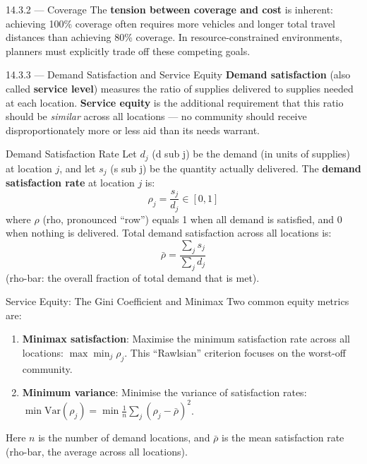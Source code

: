 \documentclass[aspectratio=169,10pt]{beamer}
\begin{document}
\begin{frame}[allowframebreaks]{14.3.2 --- Coverage}
  \medskip
  The \textbf{tension between coverage and cost} is inherent:
  achieving 100\% coverage often requires more vehicles and longer
  total travel distances than achieving 80\% coverage.
  In resource-constrained environments, planners must explicitly trade
  off these competing goals.
\end{frame}

\begin{frame}[allowframebreaks]{14.3.3 --- Demand Satisfaction and Service Equity}
  \textbf{Demand satisfaction} (also called \textbf{service level})
  measures the ratio of supplies delivered to supplies needed at each
  location.
  \textbf{Service equity} is the additional requirement that this ratio
  should be \emph{similar} across all locations --- no community should
  receive disproportionately more or less aid than its needs warrant.

  \medskip
  \begin{block}{Demand Satisfaction Rate}
    Let $d_j$ (d sub j) be the demand (in units of supplies) at
    location $j$, and let $s_j$ (s sub j) be the quantity actually
    delivered.
    The \textbf{demand satisfaction rate} at location $j$ is:
    \[
      \rho_j = \frac{s_j}{d_j} \in [0, 1]
    \]
    where $\rho$ (rho, pronounced ``row'') equals 1 when all demand
    is satisfied, and 0 when nothing is delivered.
    Total demand satisfaction across all locations is:
    \[
      \bar{\rho} = \frac{\sum_{j} s_j}{\sum_{j} d_j}
    \]
    (rho-bar: the overall fraction of total demand that is met).
  \end{block}

  \framebreak

  \begin{block}{Service Equity: The Gini Coefficient and Minimax}
    Two common equity metrics are:
    \begin{enumerate}
      \item \textbf{Minimax satisfaction}: Maximise the minimum
            satisfaction rate across all locations:
            $\max \min_j \rho_j$.
            This ``Rawlsian'' criterion focuses on the worst-off
            community.
      \item \textbf{Minimum variance}: Minimise the variance of
            satisfaction rates:
            $\min \text{Var}(\rho_j) = \min \frac{1}{n}\sum_j (\rho_j - \bar{\rho})^2$.
    \end{enumerate}
    Here $n$ is the number of demand locations, and $\bar{\rho}$ is the
    mean satisfaction rate (rho-bar, the average across all locations).
  \end{block}


\end{frame}
\end{document}
